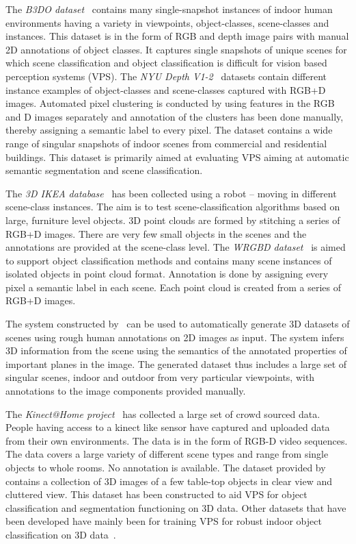 \documentclass[letterpaper, 10 pt, conference]{ieeeconf}
\begin{document}
The \textit{B3DO dataset}~\cite{Janoch:ICCV2011} contains many
single-snapshot instances of indoor human environments having a
variety in viewpoints, object-classes, scene-classes and
instances. This dataset is in the form of RGB and depth image pairs
with manual 2D annotations of object classes. It captures single
snapshots of unique scenes for which scene classification and object
classification is difficult for vision based perception systems (VPS).
The \textit{NYU Depth V1-2}~\cite{Silberman:ECCV2012} datasets contain
different instance examples of object-classes and scene-classes
captured with RGB+D images. Automated pixel clustering is conducted by
using features in the RGB and D images separately and annotation of
the clusters has been done manually, thereby assigning a semantic
label to every pixel. The dataset contains a wide range of singular
snapshots of indoor scenes from commercial and residential
buildings. This dataset is primarily aimed at evaluating VPS aiming at
automatic semantic segmentation and scene classification.

The \textit{3D IKEA database}~\cite{Swadzba:RAS2012} has been collected using a robot -- moving in different scene-class instances. The 
aim is to test scene-classification algorithms based on large, furniture level objects. 3D point clouds are formed by 
stitching a series of RGB+D images. There are very few small objects in the scenes and the annotations are provided at the 
scene-class level. The \textit{WRGBD dataset}~\cite{Lai:ICRA2011} is aimed to support object classification methods and contains many scene 
instances of isolated objects in point cloud format. Annotation is done by assigning every pixel a semantic label in each scene. Each point 
cloud is created from a series of RGB+D images.

The system constructed by~\cite{Russell:CVPR2009} can be used to automatically generate 3D datasets of scenes using rough human annotations 
on 2D images as input. The system infers 3D information from the scene using the semantics of the annotated properties of important planes 
in the image. The generated dataset thus includes a large set of singular scenes, indoor and outdoor from very particular viewpoints, with 
annotations to the image components provided manually.

The \textit{Kinect@Home project}~\cite{Goransson13a} has collected a large set of crowd sourced data. People having access to a kinect like sensor 
have captured and uploaded data from their own environments. The data is in the form of RGB-D video sequences. The data covers a large 
variety of different scene types and range from single objects to whole rooms. No annotation is available.
The dataset provided by~\cite{Sun:ECCV2010} contains a collection of 3D images of a few table-top objects in clear view and cluttered view. 
This dataset has been constructed to aid VPS for object classification and segmentation functioning on 3D data. Other datasets that have 
been developed have mainly been for training VPS for robust indoor object classification on 3D data~\cite{WillowGarage:2011,Kimmel:ACCV2010}.
\end{document}
